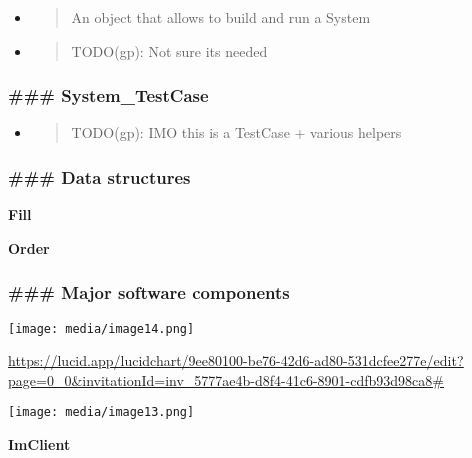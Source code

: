 \documentclass[11pt, reqno]{amsart}
\begin{document}
\begin{itemize}
\item
  \begin{quote}
  An object that allows to build and run a System
  \end{quote}
\item
  \begin{quote}
  TODO(gp): Not sure it\textquotesingle s needed
  \end{quote}
\end{itemize}

\hypertarget{system_testcase}{%
\subsubsection{\texorpdfstring{\textbf{\#\#\#
System\_TestCase}}{\#\#\# System\_TestCase}}\label{system_testcase}}

\begin{itemize}
\item
  \begin{quote}
  TODO(gp): IMO this is a TestCase + various helpers
  \end{quote}
\end{itemize}

\hypertarget{data-structures}{%
\subsubsection{\#\#\# Data structures}\label{data-structures}}

\textbf{Fill}

\textbf{Order}

\hypertarget{major-software-components}{%
\subsubsection{\#\#\# Major software
components}\label{major-software-components}}

\texttt{[image: media/image14.png]}

\href{https://lucid.app/lucidchart/9ee80100-be76-42d6-ad80-531dcfee277e/edit?page=0_0\&invitationId=inv_5777ae4b-d8f4-41c6-8901-cdfb93d98ca8\#}{\ul{https://lucid.app/lucidchart/9ee80100-be76-42d6-ad80-531dcfee277e/edit?page=0\_0\&invitationId=inv\_5777ae4b-d8f4-41c6-8901-cdfb93d98ca8\#}}

\texttt{[image: media/image13.png]}

\textbf{ImClient}
\end{document}
